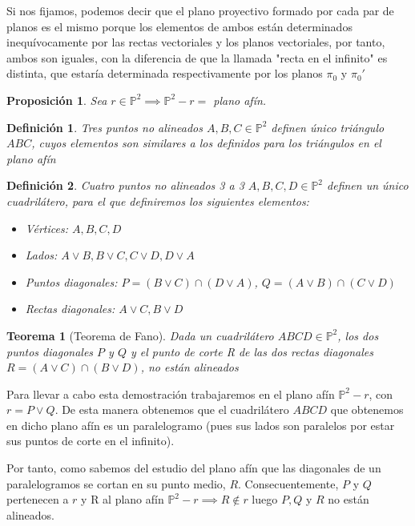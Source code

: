 \documentclass[11pt, a4paper]{article}
\makeatletter
\newif\IfInSansMode
\let\oldsf\sffamily
\renewcommand*{\sffamily}{\oldsf\mathversion{sans}\InSansModetrue}
\let\oldnorm\normalfont
\renewcommand*{\normalfont}{\oldnorm\InSansModefalse\mathversion{normal}}
\renewenvironment{proof}[1][\proofname] {\vspace{-15pt}\par\pushQED{\qed}\normalfont\topsep6\p@\@plus6\p@\relax\trivlist\item[\hskip\labelsep\it#1\@addpunct{.}]\ignorespaces}{\popQED\endtrivlist\@endpefalse}
\renewenvironment{proof}[1][\proofname] {\par\pushQED{\qed}\normalfont\topsep6\p@\@plus6\p@\relax\trivlist\item[\hskip\labelsep\itshape\sffamily#1\@addpunct{.}]\ignorespaces}{\popQED\endtrivlist\@endpefalse}
\theoremstyle{theorem-style}
\newtheorem{nth}{Teorema}[section]
\newtheorem{nprop}{Proposición}[section]
\theoremstyle{definition-style}
\newtheorem{ndef}{Definición}[section]
\theoremstyle{remark-style}
\theoremstyle{example-style}
\makeatother
\begin{document}
Si nos fijamos, podemos decir que el plano proyectivo formado por cada par de planos es el mismo porque los elementos de ambos están determinados inequívocamente por las rectas vectoriales y los planos vectoriales, por tanto, ambos son iguales, con la diferencia de que la llamada "recta en el infinito" es distinta, que estaría determinada respectivamente por los planos $\pi_0$ y $\pi_0'$

\begin{nprop}
Sea $r \in \mathbb{P}^2 \implies \mathbb{P}^2 - r =$ plano afín.
\end{nprop}

\begin{ndef}
Tres puntos no alineados $A,B,C \in \mathbb{P}^2$ definen único triángulo $ABC$, cuyos elementos son similares a los definidos para los triángulos en el plano afín
\end{ndef}

\begin{ndef}
Cuatro puntos no alineados 3 a 3 $A,B,C,D \in \mathbb{P}^2$ definen un único cuadrilátero, para el que definiremos los siguientes elementos:
\begin{itemize}
	\item Vértices: $A, B, C, D$
	\item Lados: $A\vee B, B\vee C, C\vee D, D\vee A$
	\item Puntos diagonales: $P = (B\vee C) \cap (D\vee A)$, $Q = (A\vee B) \cap (C\vee D)$ 
	\item Rectas diagonales: $A\vee C, B\vee D$
\end{itemize} 
\end{ndef}

\begin{nth}[Teorema de Fano]
	Dada un cuadrilátero $ABCD \in \mathbb{P}^2$, los dos puntos diagonales $P$ y $Q$ y el punto de corte R de las dos rectas diagonales $R = (A \vee C)\cap (B\vee D)$, no están alineados 
\\
	

\end{nth}
\begin{proof}
	Para llevar a cabo esta demostración trabajaremos en el plano afín $\mathbb{P}^2 -r$, con $r = P\vee Q$. De esta manera obtenemos que el cuadrilátero $ABCD$ que obtenemos en dicho plano afín es un paralelogramo (pues sus lados son paralelos por estar sus puntos de corte en el infinito). 
	
	Por tanto, como sabemos del estudio del plano afín que las diagonales de un paralelogramos se cortan en su punto medio, $R$. Consecuentemente, $P$ y $Q$ pertenecen a $r$ y R al plano afín $\mathbb{P}^2 - r \implies R \notin r$ luego $P,Q$ y $R$ no están alineados.  
	\end{proof}
\end{document}
